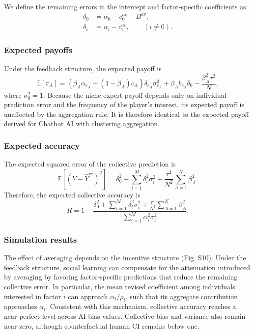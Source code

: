 \documentclass[12pt]{article}
\begin{document}
We define the remaining errors in the intercept and factor-specific coefficients as
\begin{align}
\delta_0 &= \alpha_0-c_0^{av}-B^{av},\\
\delta_i &= \alpha_i-c_i^{av}, \qquad (i\neq0).
\end{align}

\subsubsection*{Expected payoffs}

Under the feedback structure, the expected payoff is
\begin{equation}
\mathbb{E}[\pi_A] = \left\{\beta_A\alpha_{e_A}+(1-\beta_A)c_A\right\}
\delta_{e_A}\sigma_{e_A}^2 +\beta_Ab_{e_A}\delta_0 -\frac{\beta_A^2\tau^2}{N},
\end{equation}
where $\sigma_0^2=1$.
Because the niche-expert payoff depends only on individual prediction error and the frequency of the player's interest, its expected payoff is unaffected by the aggregation rule. 
It is therefore identical to the expected payoff derived for Chatbot AI with clustering aggregation.

\subsubsection*{Expected accuracy}

The expected squared error of the collective prediction is
\begin{equation}
\mathbb{E}[(Y-\hat{Y}^{re})^2] = \delta_0^2
+\sum_{i=1}^{M}\delta_i^2\sigma_i^2
+\frac{\tau^2}{N^2}\sum_{A=1}^{N}\beta_A^2.
\end{equation}
Therefore, the expected collective accuracy is
\begin{equation}
R = 1 - \frac{\delta_0^2
+\sum_{i=1}^{M}\delta_i^2\sigma_i^2
+\frac{\tau^2}{N^2}\sum_{A=1}^{N}\beta_A^2}{\sum_{i=1}^{M}\alpha_i^2\sigma_i^2}.
\end{equation}

\subsubsection*{Simulation results}

The effect of averaging depends on the incentive structure (Fig. S10). 
Under the feedback structure, social learning can compensate for the attenuation introduced by averaging by favoring factor-specific predictions that reduce the remaining collective error. 
In particular, the mean revised coefficient among individuals interested in factor $i$ can approach $\alpha_i/\rho_i$, such that its aggregate contribution approaches $\alpha_i$. 
Consistent with this mechanism, collective accuracy reaches a near-perfect level across AI bias values. 
Collective bias and variance also remain near zero, although counterfactual human CI remains below one.
\end{document}
